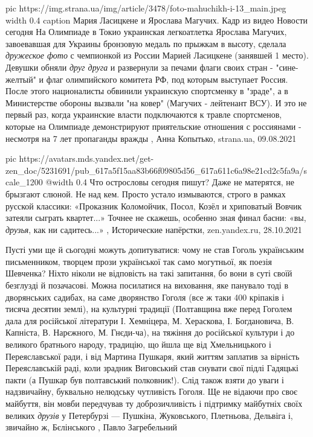 \ifcmt
  pic https://img.strana.ua/img/article/3478/foto-mahuchikh-i-13_main.jpeg
  width 0.4
	caption Мария Ласицкене и Ярослава Магучих. Кадр из видео Новости сегодня 
\fi
На Олимпиаде в Токио украинская легкоатлетка Ярослава Магучих, завоевавшая для
Украины бронзовую медаль по прыжкам в высоту, сделала \emph{дружеское фото} с
чемпионкой из России Марией Ласицкене (занявшей 1 место).
Девушки обняли \emph{друг друга} и развернули за печами флаги своих стран -
"сине-желтый" и флаг олимпийского комитета РФ, под которым выступает Россия.
После этого националисты обвинили украинскую спортсменку в "зраде", а в
Министерстве обороны вызвали "на ковер" (Магучих - лейтенант ВСУ). И это не
первый раз, когда украинские власти подключаются к травле спортсменов, которые
на Олимпиаде демонстрируют приятельские отношения с россиянами - несмотря на 7
лет пропаганды вражды
, 
Анна Копытько, strana.ua, 09.08.2021

\ifcmt
  pic https://avatars.mds.yandex.net/get-zen_doc/5231691/pub_617a5f15aa83b66f09805d56_617a611c6a98e21cd2c5fa9a/scale_1200
  @width 0.4
\fi
Что острословы сегодня пишут? Даже не матерятся, не брызгают слюной. Не над
кем. Просто устало измываются, строго в рамках русской классики: «Проказник
Коломойчик, Посол, Козёл и хриповатый Вовчик затеяли сыграть квартет...» Точнее
не скажешь, особенно зная финал басни: «вы, \emph{друзья}, как ни садитесь...»
, 
Исторические напёрстки, zen.yandex.ru, 28.10.2021

Пусті уми ще й сьогодні можуть допитуватися: чому не став Гоголь українським
письменником, творцем прози української так само могутньої, як поезія Шевченка?
Ніхто ніколи не відповість на такі запитання, бо вони в суті своїй безглузді й
позачасові. Можна посилатися на виховання, яке панувало тоді в дворянських
садибах, на саме дворянство Гоголя (все ж таки 400 кріпаків і тисяча десятин
землі), на культурні традиції (Полтавщина вже перед Гоголем дала для російської
літератури І. Хемніцера, М. Хераскова, І. Богдановича, В. Капніста, В.
Нарєжного, М. Гнєди-ча), на тяжіння до російської культури і до великого
братнього народу, традицію, що йшла ще від Хмельницького і Переяславської ради,
і від Мартина Пушкаря, який життям заплатив за вірність Переяславській раді,
коли зрадник Виговський став снувати свої підлі Гадяцькі пакти (а Пушкар був
полтавський полковник!). Слід також взяти до уваги і надзвичайну, буквально
нелюдську чутливість Гоголя. Ще не відаючи про своє майбуття, він мовби
передчував ту доброзичливість і підтримку майбутніх своїх великих \emph{друзів} у
Петербурзі — Пушкіна, Жуковського, Плетньова, Дельвіга і, звичайно ж,
Бєлінського
, Павло Загребельний
